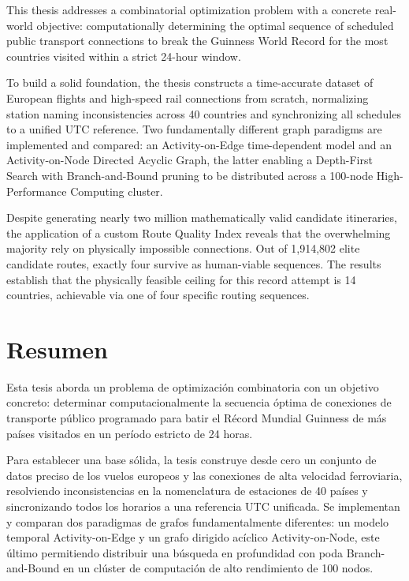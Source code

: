 \documentclass[11pt, a4paper,twoside,openany]{tfg_dtic_upf}
\numberwithin{equation}{section}
\begin{document}
This thesis addresses a combinatorial optimization problem with a concrete real-world objective: computationally determining the optimal sequence of scheduled public transport connections to break the Guinness World Record for the most countries visited within a strict 24-hour window.

To build a solid foundation, the thesis constructs a time-accurate dataset of European flights and high-speed rail connections from scratch, normalizing station naming inconsistencies across 40 countries and synchronizing all schedules to a unified UTC reference. Two fundamentally different graph paradigms are implemented and compared: an Activity-on-Edge time-dependent model and an Activity-on-Node Directed Acyclic Graph, the latter enabling a Depth-First Search with Branch-and-Bound pruning to be distributed across a 100-node High-Performance Computing cluster.

Despite generating nearly two million mathematically valid candidate itineraries, the application of a custom Route Quality Index reveals that the overwhelming majority rely on physically impossible connections. Out of 1,914,802 elite candidate routes, exactly four survive as human-viable sequences. The results establish that the physically feasible ceiling for this record attempt is 14 countries, achievable via one of four specific routing sequences.

\section*{\Large \sffamily Resumen}
Esta tesis aborda un problema de optimización combinatoria con un objetivo concreto: determinar computacionalmente la secuencia óptima de conexiones de transporte público programado para batir el Récord Mundial Guinness de más países visitados en un período estricto de 24 horas.

Para establecer una base sólida, la tesis construye desde cero un conjunto de datos preciso de los vuelos europeos y las conexiones de alta velocidad ferroviaria, resolviendo inconsistencias en la nomenclatura de estaciones de 40 países y sincronizando todos los horarios a una referencia UTC unificada. Se implementan y comparan dos paradigmas de grafos fundamentalmente diferentes: un modelo temporal Activity-on-Edge y un grafo dirigido acíclico Activity-on-Node, este último permitiendo distribuir una búsqueda en profundidad con poda Branch-and-Bound en un clúster de computación de alto rendimiento de 100 nodos.
\end{document}
